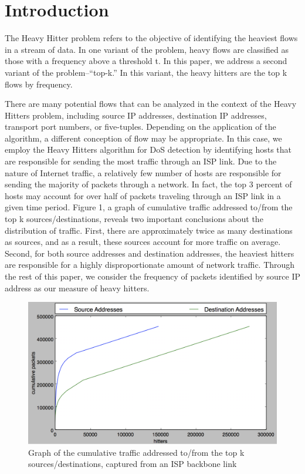 \section{Introduction}
\label{sec:intro}
The Heavy Hitter problem refers to the objective of identifying the heaviest flows in a stream of data. In one variant of the problem, heavy flows are classified as those with a frequency above a threshold t. In this paper, we address a second variant of the problem--``top-k.'' In this variant, the heavy hitters are the top k flows by frequency. 

There are many potential flows that can be analyzed in the context of the Heavy Hitters problem, including source IP addresses, destination IP addresses, transport port numbers, or five-tuples. Depending on the application of the algorithm, a different conception of flow may be appropriate. In this case, we employ the Heavy Hitters algorithm for DoS detection by identifying hosts that are responsible for sending the most traffic through an ISP link. Due to the nature of Internet traffic, a relatively few number of hosts are responsible for sending the majority of packets through a network. In fact, the top 3 percent of hosts may account for over half of packets traveling through an ISP link in a given time period. Figure 1, a graph of cumulative traffic addressed to/from the top k sources/destinations, reveals two important conclusions about the distribution of traffic. First, there are approximately twice as many destinations as sources, and as a result, these sources account for more traffic on average. Second, for both source addresses and destination addresses, the heaviest hitters are responsible for a highly disproportionate amount of network traffic. Through the rest of this paper, we consider the frequency of packets identified by source IP address as our measure of heavy hitters.

\begin{figure}[t]
  \centering
    \includegraphics[scale=0.3]{cumulative}
     \caption{Graph of the cumulative traffic addressed to/from the top k sources/destinations, captured from an ISP backbone link}
     \label{fig:bp-image}
\end{figure}
